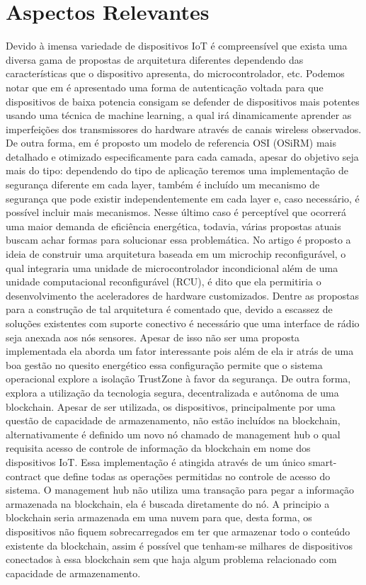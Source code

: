 \documentclass[article,12pt]{abntex2}
\begin{document}
\section{Aspectos Relevantes}
Devido à imensa variedade de dispositivos IoT é compreensível que exista uma diversa gama de propostas de arquitetura diferentes dependendo das características que o dispositivo apresenta, do microcontrolador, etc. Podemos notar que em \cite{Das:2018} é apresentado uma forma de autenticação voltada para que dispositivos de baixa potencia consigam se defender de dispositivos mais potentes usando uma técnica de machine learning, a qual irá dinamicamente aprender as imperfeições dos transmissores do hardware através de canais wireless observados. De outra forma, em \cite{Minoli:2017} é proposto um modelo de referencia OSI (OSiRM) mais detalhado e otimizado especificamente para cada camada, apesar do objetivo seja mais do tipo: dependendo do tipo de aplicação teremos uma implementação de segurança diferente em cada layer, também é incluído um mecanismo de segurança que pode existir independentemente em cada layer e, caso necessário, é possível incluir mais mecanismos. Nesse último caso é perceptível que ocorrerá uma maior demanda de eficiência energética, todavia, várias propostas atuais buscam achar formas para solucionar essa problemática.
\newline
No artigo \cite{Oliveira:2018} é proposto a ideia de construir uma arquitetura baseada em um microchip reconfigurável, o qual integraria uma unidade de microcontrolador incondicional além de uma unidade computacional reconfigurável (RCU), é dito que ela permitiria o desenvolvimento the aceleradores de hardware customizados. Dentre as propostas para a construção de tal arquitetura é comentado que, devido a escassez de soluções existentes com suporte conectivo é necessário que uma interface de rádio seja anexada aos nós sensores. Apesar de isso não ser uma proposta implementada ela aborda um fator interessante pois além de ela ir atrás de uma boa gestão no quesito energético essa configuração permite que o sistema operacional explore a isolação TrustZone à favor da segurança. De outra forma, \cite{Novo:2018} explora a utilização da tecnologia segura, decentralizada e autônoma de uma blockchain. Apesar de ser utilizada, os dispositivos, principalmente por uma questão de capacidade de armazenamento, não estão incluídos na blockchain, alternativamente é definido um novo nó chamado de management hub o qual requisita acesso de controle de informação da blockchain em nome dos dispositivos IoT. Essa implementação é atingida através de um único smart-contract que define todas as operações permitidas no controle de acesso do sistema. O management hub não utiliza uma transação para pegar a informação armazenada na blockchain, ela é buscada diretamente do nó. A principio a blockchain seria armazenada em uma nuvem para que, desta forma, os dispositivos não fiquem sobrecarregados em ter que armazenar todo o conteúdo existente da blockchain, assim é possível que tenham-se milhares de dispositivos conectados à essa blockchain sem que haja algum problema relacionado com capacidade de armazenamento.
\end{document}
